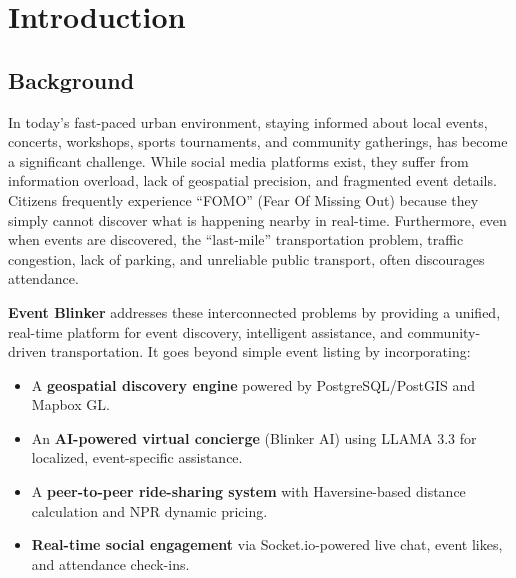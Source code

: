 \chapter{Introduction}

\section{Background}
In today's fast-paced urban environment, staying informed about local events, concerts, workshops, sports tournaments, and community gatherings, has become a significant challenge. While social media platforms exist, they suffer from information overload, lack of geospatial precision, and fragmented event details. Citizens frequently experience ``FOMO'' (Fear Of Missing Out) because they simply cannot discover what is happening nearby in real-time. Furthermore, even when events are discovered, the ``last-mile'' transportation problem, traffic congestion, lack of parking, and unreliable public transport, often discourages attendance.

\textbf{Event Blinker} addresses these interconnected problems by providing a unified, real-time platform for event discovery, intelligent assistance, and community-driven transportation. It goes beyond simple event listing by incorporating:
\begin{itemize}[noitemsep]
    \item A \textbf{geospatial discovery engine} powered by PostgreSQL/PostGIS and Mapbox GL.
    \item An \textbf{AI-powered virtual concierge} (Blinker AI) using LLAMA 3.3 for localized, event-specific assistance.
    \item A \textbf{peer-to-peer ride-sharing system} with Haversine-based distance calculation and NPR dynamic pricing.
    \item \textbf{Real-time social engagement} via Socket.io-powered live chat, event likes, and attendance check-ins.
\end{itemize}


